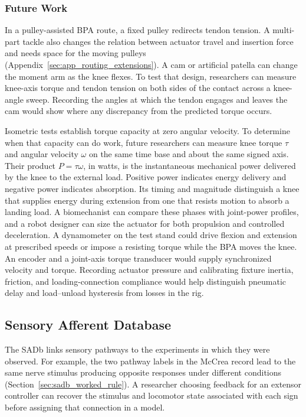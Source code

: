 \subsubsection{Future Work}\label{sec:fw_routing}

In a pulley-assisted BPA route, a fixed pulley redirects tendon tension. A multi-part tackle also changes the relation between actuator travel and insertion force and needs space for the moving pulleys (Appendix~\ref{sec:app_routing_extensions}). A cam or artificial patella can change the moment arm as the knee flexes. To test that design, researchers can measure knee-axis torque and tendon tension on both sides of the contact across a knee-angle sweep. Recording the angles at which the tendon engages and leaves the cam would show where any discrepancy from the predicted torque occurs.

Isometric tests establish torque capacity at zero angular velocity. To determine when that capacity can do work, future researchers can measure knee torque $\tau$ and angular velocity $\omega$ on the same time base and about the same signed axis. Their product $P=\tau\omega$, in watts, is the instantaneous mechanical power delivered by the knee to the external load. Positive power indicates energy delivery and negative power indicates absorption. Its timing and magnitude distinguish a knee that supplies energy during extension from one that resists motion to absorb a landing load. A biomechanist can compare these phases with joint-power profiles, and a robot designer can size the actuator for both propulsion and controlled deceleration. A dynamometer on the test stand could drive flexion and extension at prescribed speeds or impose a resisting torque while the BPA moves the knee. An encoder and a joint-axis torque transducer would supply synchronized velocity and torque. Recording actuator pressure and calibrating fixture inertia, friction, and loading-connection compliance would help distinguish pneumatic delay and load--unload hysteresis from losses in the rig.

\subsection{Sensory Afferent Database}

The SADb links sensory pathways to the experiments in which they were observed. For example, the two pathway labels in the McCrea record lead to the same nerve stimulus producing opposite responses under different conditions (Section~\ref{sec:sadb_worked_rule}). A researcher choosing feedback for an extensor controller can recover the stimulus and locomotor state associated with each sign before assigning that connection in a model.

